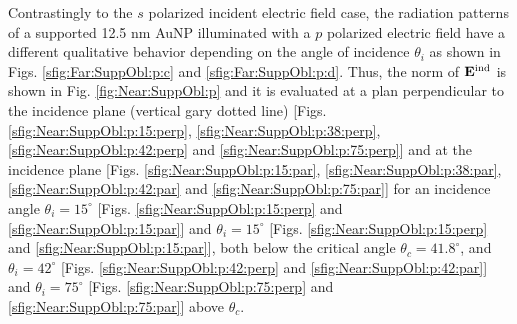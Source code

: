 Contrastingly to the $s$ polarized incident electric field case, the radiation patterns of a supported 12.5 nm AuNP illuminated with a $p$ polarized electric field have a different qualitative behavior depending on the angle of incidence $\theta_i$ as shown in Figs. \ref{sfig:Far:SuppObl:p:c} and  \ref{sfig:Far:SuppObl:p:d}. Thus, the norm of $\vb{E}^\text{ind}$ is shown in Fig. \ref{fig:Near:SuppObl:p} and it is evaluated at a plan perpendicular to the incidence plane (vertical gary dotted line) [Figs. \ref{sfig:Near:SuppObl:p:15:perp}, \ref{sfig:Near:SuppObl:p:38:perp}, \ref{sfig:Near:SuppObl:p:42:perp} and \ref{sfig:Near:SuppObl:p:75:perp}] and at the incidence  plane [Figs. \ref{sfig:Near:SuppObl:p:15:par}, \ref{sfig:Near:SuppObl:p:38:par}, \ref{sfig:Near:SuppObl:p:42:par} and \ref{sfig:Near:SuppObl:p:75:par}] for an incidence angle $\theta_i = 15^\circ$ [Figs. \ref{sfig:Near:SuppObl:p:15:perp}  and \ref{sfig:Near:SuppObl:p:15:par}] and  $\theta_i = 15^\circ$ [Figs. \ref{sfig:Near:SuppObl:p:15:perp}  and \ref{sfig:Near:SuppObl:p:15:par}], both below the critical angle $\theta_c = 41.8^\circ$, and $\theta_i = 42^\circ$ [Figs. \ref{sfig:Near:SuppObl:p:42:perp}  and \ref{sfig:Near:SuppObl:p:42:par}] and  $\theta_i = 75^\circ$ [Figs. \ref{sfig:Near:SuppObl:p:75:perp}  and \ref{sfig:Near:SuppObl:p:75:par}] above $\theta_c$.


